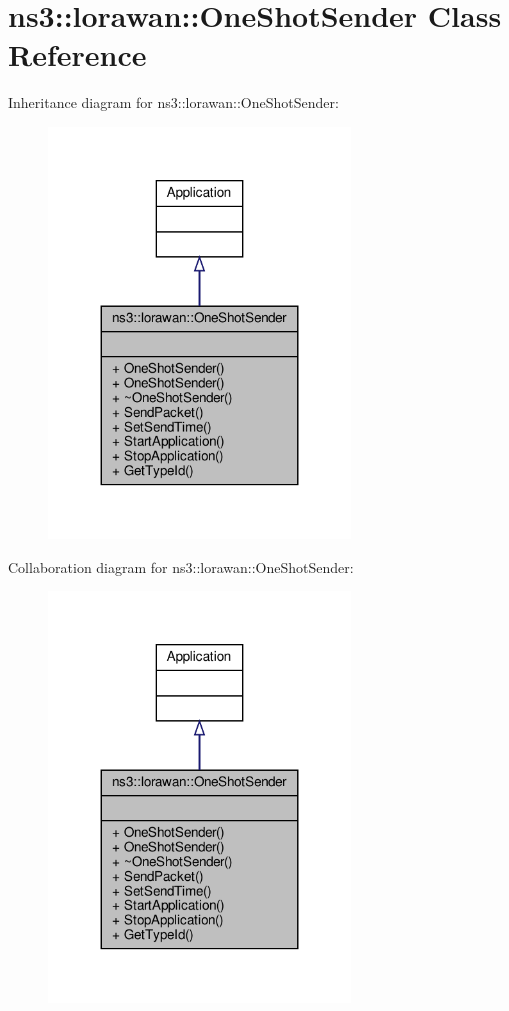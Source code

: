 \hypertarget{classns3_1_1lorawan_1_1OneShotSender}{}\section{ns3\+:\+:lorawan\+:\+:One\+Shot\+Sender Class Reference}
\label{classns3_1_1lorawan_1_1OneShotSender}


Inheritance diagram for ns3\+:\+:lorawan\+:\+:One\+Shot\+Sender\+:
\nopagebreak
\begin{figure}[H]
\begin{center}
\leavevmode
\includegraphics[width=227pt]{classns3_1_1lorawan_1_1OneShotSender__inherit__graph}
\end{center}
\end{figure}


Collaboration diagram for ns3\+:\+:lorawan\+:\+:One\+Shot\+Sender\+:
\nopagebreak
\begin{figure}[H]
\begin{center}
\leavevmode
\includegraphics[width=227pt]{classns3_1_1lorawan_1_1OneShotSender__coll__graph}
\end{center}
\end{figure}
